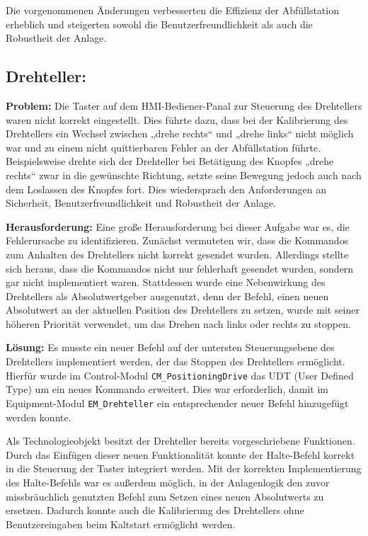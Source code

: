 Die vorgenommenen Änderungen verbesserten die Effizienz der Abfüllstation erheblich und steigerten sowohl die Benutzerfreundlichkeit als 
auch die Robustheit der Anlage.

\subsection{Drehteller:} 
\textbf{Problem:}  
Die Taster auf dem HMI-Bediener-Panal zur Steuerung des Drehtellers waren nicht korrekt eingestellt. Dies führte dazu, dass bei der Kalibrierung des Drehtellers ein 
Wechsel zwischen „drehe rechts“ und „drehe links“ nicht möglich war und zu einem nicht quittierbaren Fehler an der Abfüllstation führte. 
Beispielsweise drehte sich der Drehteller bei Betätigung des Knopfes „drehe rechts“ zwar in die gewünschte Richtung, setzte seine Bewegung 
jedoch auch nach dem Loslassen des Knopfes fort. Dies wiedersprach den Anforderungen an Sicherheit, Benutzerfreundlichkeit und Robustheit 
der Anlage.  

\textbf{Herausforderung:}  
Eine große Herausforderung bei dieser Aufgabe war es, die Fehlerursache zu identifizieren. Zunächst vermuteten wir, dass die Kommandos zum 
Anhalten des Drehtellers nicht korrekt gesendet wurden. Allerdings stellte sich heraus, dass die Kommandos nicht nur fehlerhaft gesendet wurden, 
sondern gar nicht implementiert waren. Stattdessen wurde eine Nebenwirkung des Drehtellers als Absolutwertgeber ausgenutzt, denn der Befehl, einen 
neuen Absolutwert an der aktuellen Position des Drehtellers zu setzen, wurde mit seiner höheren Priorität verwendet, um das Drehen nach links 
oder rechts zu stoppen.  

\textbf{Lösung:}  
Es musste ein neuer Befehl auf der untersten Steuerungsebene des Drehtellers implementiert werden, der das Stoppen des Drehtellers ermöglicht. 
Hierfür wurde im Control-Modul \texttt{CM\_PositioningDrive} das UDT (User Defined Type) um ein neues Kommando erweitert. Dies war erforderlich, 
damit im Equipment-Modul \texttt{EM\_Drehteller} ein entsprechender neuer Befehl hinzugefügt werden konnte.  

Als Technologieobjekt besitzt der Drehteller bereits vorgeschriebene Funktionen. Durch das Einfügen dieser neuen Funktionalität konnte der 
Halte-Befehl korrekt in die Steuerung der Taster integriert werden. Mit der korrekten Implementierung des 
Halte-Befehls war es außerdem möglich, in der Anlagenlogik den zuvor missbräuchlich genutzten Befehl zum Setzen eines neuen Absolutwerts zu 
ersetzen. Dadurch konnte auch die Kalibrierung des Drehtellers ohne Benutzereingaben beim Kaltstart ermöglicht werden.  


